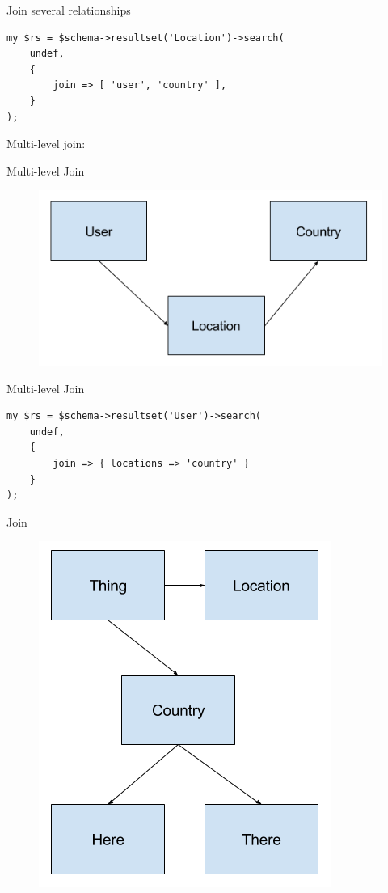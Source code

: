 \begin{frame}[fragile]{Join several relationships}

\begin{lstlisting}
my $rs = $schema->resultset('Location')->search(
    undef,
    {
        join => [ 'user', 'country' ],
    }
);
\end{lstlisting}
\end{frame}

Multi-level join:

\begin{frame}[fragile]{Multi-level Join}
\begin{figure}[!ht]
\centering
\includegraphics[width=1\linewidth]{img/join-multi-level.png}
\end{figure}
\end{frame}

\begin{frame}[fragile]{Multi-level Join}
\begin{lstlisting}
my $rs = $schema->resultset('User')->search(
    undef,
    {
        join => { locations => 'country' }
    }
);
\end{lstlisting}
\end{frame}

\begin{frame}[fragile]{Join}
\begin{figure}[!ht]
\centering
\includegraphics[width=0.4\linewidth]{img/join-complex.png}
\end{figure}
\end{frame}

